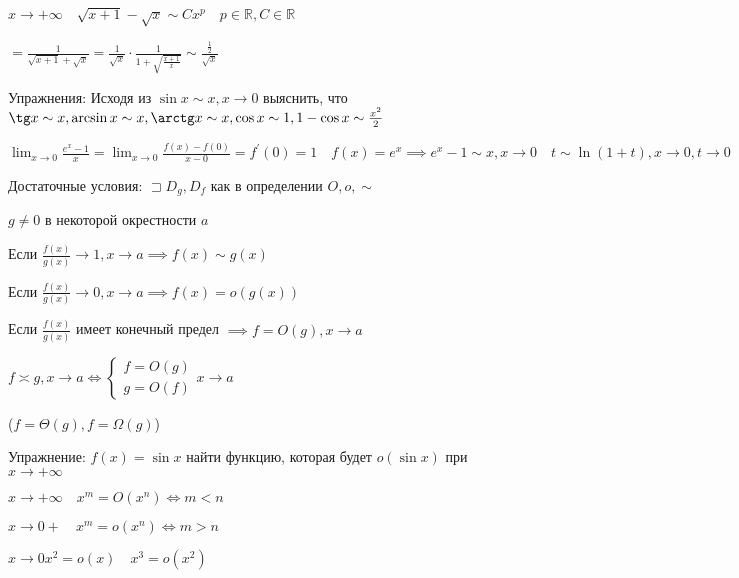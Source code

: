 \documentclass{book}
\newcommand\R{\ensuremath{\mathbb{R}}}
\newcommand{\p}[1]{#1^{\prime}}
\theoremstyle{definition}
\begin{document}
$x\to +\infty \quad \sqrt{x+1}-\sqrt{x}\sim Cx^{p}\quad p\in \R, C\in \R  $ 

$= \frac{1}{\sqrt{x+1}+\sqrt{x}  } = \frac{1}{\sqrt{x} } \cdot  \frac{1}{1+\sqrt{\frac{x+1}{x}} }\sim \frac{\frac{1}{2}}{\sqrt{x} }$

Упражнения: Исходя из $\sin x\sim x, x\to 0$ выяснить, что $\tg x\sim x, \arcsin x\sim x, \arctg x\sim x, \cos x\sim 1, 1-\cos x\sim \frac{x^2}{2}$

$\lim_{x \to 0} \frac{e^x-1}{x} = \lim_{x \to 0} \frac{f(x) - f(0)}{x - 0} = \p f(0) = 1\quad f(x) = e^x \implies e^x-1\sim x, x\to 0\quad t\sim \ln (1+t), x\to 0, t\to 0$ 

Достаточные условия: $\sqsupset D_g, D_f$ как в определении $O, o, \sim $

$g \neq 0$ в некоторой окрестности $a$

Если  $\frac{f(x)}{g(x)} \to 1, x\to a \implies  f(x) \sim g(x)$

Если $\frac{f(x) }{g(x)}\to 0, x\to a\implies f(x) = o(g(x))$

Если $\frac{f(x)}{g(x)}$ имеет конечный предел $\implies  f = O(g), x\to a$

\begin{definition}
    $f\asymp g , x\to a \iff \begin{cases}
        f = O(g)\\
        g = O(f)
    \end{cases} x\to a$ 

    ($f = \Theta(g), f = \Omega(g)$)
\end{definition}

Упражнение: $f(x) = \sin x $ найти функцию, которая будет $o(\sin x)$ при $x\to +\infty $

     $x\to +\infty \quad x^m = O(x^n) \iff  m<n$

     $x\to 0+\quad x^m = o(x^n) \iff m>n$

     $x\to 0 x^2 = o(x)\quad x^3 = o\left( x^2 \right) $
\end{document}
